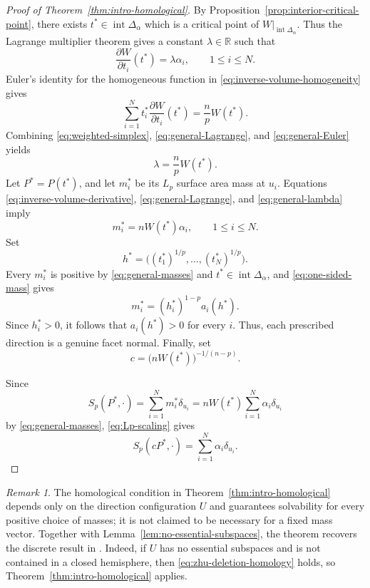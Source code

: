\documentclass[12pt,reqno]{amsart}
\numberwithin{equation}{section}
\theoremstyle{remark}
\newtheorem{remark}[theorem]{Remark}
\newcommand{\R}{\mathbb R}
\begin{document}
\begin{proof}[Proof of Theorem~\ref{thm:intro-homological}]
	By Proposition~\ref{prop:interior-critical-point}, there exists
	\(t^*\in\operatorname{int}\Delta_\alpha\) which is a critical point
	of \(W|_{\operatorname{int}\Delta_\alpha}\). Thus
 the Lagrange
	multiplier theorem gives a constant \(\lambda\in\R\) such that
	\begin{equation}\label{eq:general-Lagrange}
		\frac{\partial W}{\partial t_i}(t^*)
		=
		\lambda\alpha_i,
		\qquad
		1\leq i\leq N.
	\end{equation}
Euler's identity for the homogeneous function in \eqref{eq:inverse-volume-homogeneity} gives
\begin{equation}\label{eq:general-Euler}
 \sum_{i=1}^Nt_i^*
 \frac{\partial W}{\partial t_i}(t^*)
 =\frac np W(t^*).
\end{equation}
Combining \eqref{eq:weighted-simplex}, \eqref{eq:general-Lagrange}, and \eqref{eq:general-Euler} yields
\begin{equation}\label{eq:general-lambda}
 \lambda=\frac np W(t^*).
\end{equation}
Let $P^*=P(t^*)$, and let $m_i^*$ be its $L_p$ surface area mass at $u_i$. Equations \eqref{eq:inverse-volume-derivative}, \eqref{eq:general-Lagrange}, and \eqref{eq:general-lambda} imply
\begin{equation}\label{eq:general-masses}
 m_i^*=nW(t^*)\alpha_i,
 \qquad 1\leq i\leq N.
\end{equation}
Set
\[
 h^*=\bigl((t_1^*)^{1/p},\ldots,(t_N^*)^{1/p}\bigr).
\]
Every $m_i^*$ is positive by \eqref{eq:general-masses} and \(t^*\in\operatorname{int}\Delta_\alpha\), and \eqref{eq:one-sided-mass} gives
\[
 m_i^*=(h_i^*)^{1-p}a_i(h^*).
\]
Since $h_i^*>0$, it follows that $a_i(h^*)>0$ for every $i$. Thus, each prescribed direction is a genuine facet normal. 
Finally, set
\[
 c=\bigl(nW(t^*)\bigr)^{-1/(n-p)}.
\]

Since
\[
S_p(P^*,\cdot)
=
\sum_{i=1}^N m_i^*\delta_{u_i}
=
nW(t^*)\sum_{i=1}^N\alpha_i\delta_{u_i}
\]
by \eqref{eq:general-masses}, 
\eqref{eq:Lp-scaling} gives
\[
S_p(cP^*,\cdot)
=
\sum_{i=1}^N\alpha_i\delta_{u_i}.
\]

\end{proof}

\begin{remark}
	The homological condition in
	Theorem~\ref{thm:intro-homological} depends only on the direction
	configuration \(U\) and guarantees solvability for every positive
	choice of masses; it is not claimed to be necessary for a fixed mass
	vector. Together with Lemma~\ref{lem:no-essential-subspaces}, the
	theorem recovers the discrete result in
	\cite[Theorem~1.1]{ZhuNegative}. Indeed, if \(U\) has no essential
	subspaces and is not contained in a closed hemisphere, then
	\eqref{eq:zhu-deletion-homology} holds, so
	Theorem~\ref{thm:intro-homological} applies. 
\end{remark}
\end{document}
